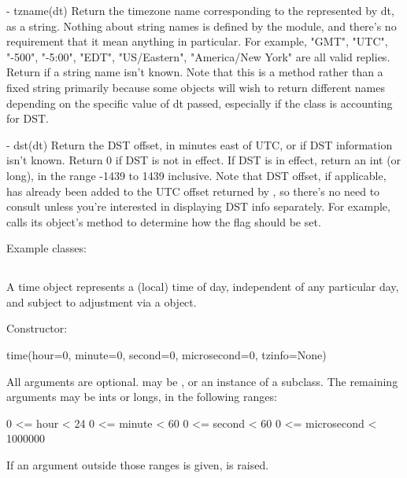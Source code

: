   - tzname(dt)
    Return the timezone name corresponding to the  represented
    by dt, as a string.  Nothing about string names is defined by the
     module, and there's no requirement that it mean anything
    in particular.  For example, "GMT", "UTC", "-500", "-5:00", "EDT",
    "US/Eastern", "America/New York" are all valid replies.  Return
     if a string name isn't known.  Note that this is a method
    rather than a fixed string primarily because some  objects
    will wish to return different names depending on the specific value
    of dt passed, especially if the  class is accounting for DST.

  - dst(dt)
    Return the DST offset, in minutes east of UTC, or  if
    DST information isn't known.  Return 0 if DST is not in effect.
    If DST is in effect, return an int (or long), in the range -1439
    to 1439 inclusive.  Note that DST offset, if applicable, has
    already been added to the UTC offset returned by
    , so there's no need to consult 
    unless you're interested in displaying DST info separately.  For
    example,  calls its 
    object's  method to determine how the
     flag should be set.

Example  classes:




\subsection{ \label{datetime-timetz}}

A time object represents a (local) time of day, independent of any
particular day, and subject to adjustment via a  object.

Constructor:

    time(hour=0, minute=0, second=0, microsecond=0, tzinfo=None)

    All arguments are optional.   may be , or
    an instance of a  subclass.  The remaining arguments
    may be ints or longs, in the following ranges:

        0 <= hour < 24
        0 <= minute < 60
        0 <= second < 60
        0 <= microsecond < 1000000

    If an argument outside those ranges is given,
     is raised.

